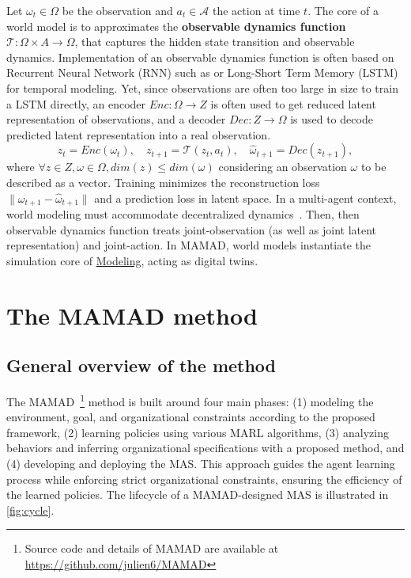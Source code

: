 \documentclass[pdflatex,sn-mathphys-num]{sn-jnl}%
\theoremstyle{thmstyleone}%
\theoremstyle{thmstyletwo}%
\theoremstyle{thmstylethree}%
\begin{document}
Let $\omega_t \in \Omega$ be the observation and $a_t \in \mathcal{A}$ the action at time $t$. The core of a world model is to approximates the \textbf{observable dynamics function} $\mathcal{T}: \Omega \times A \rightarrow \Omega$, that captures the hidden state transition and observable dynamics. Implementation of an observable dynamics function is often based on Recurrent Neural Network (RNN) such as or Long-Short Term Memory (LSTM)~\cite{hochreiter1997long} for temporal modeling. Yet, since observations are often too large in size to train a LSTM directly, an encoder $Enc: \Omega \rightarrow Z$ is often used to get reduced latent representation of observations, and a decoder $Dec: Z \rightarrow \Omega$ is used to decode predicted latent representation into a real observation.
\[
    z_t = Enc(\omega_t), \quad
    z_{t+1} = \mathcal{T}(z_t, a_t), \quad
    \hat{\omega}_{t+1} = Dec(z_{t+1}),
\]
where $\forall z \in Z, \omega \in \Omega, dim(z) \leq dim(\omega)$ considering an observation $\omega$ to be described as a vector.
Training minimizes the reconstruction loss $\|\omega_{t+1} - \hat{\omega}_{t+1}\|$ and a prediction loss in latent space.
%
In a multi-agent context, world modeling must accommodate decentralized dynamics~\cite{yang2021representation}. Then, then observable dynamics function treats joint-observation (as well as joint latent representation) and joint-action. In MAMAD, world models instantiate the simulation core of \hyperref[sec:modelling]{Modeling}, acting as digital twins.



\section{The MAMAD method}\label{sec:mamad}

\subsection{General overview of the method}

The MAMAD~\footnote{Source code and details of MAMAD are available at \url{https://github.com/julien6/MAMAD}} method is built around four main phases: (1) modeling the environment, goal, and organizational constraints according to the proposed framework, (2) learning policies using various MARL algorithms, (3) analyzing behaviors and inferring organizational specifications with a proposed method, and (4) developing and deploying the MAS. This approach guides the agent learning process while enforcing strict organizational constraints, ensuring the efficiency of the learned policies. The lifecycle of a MAMAD-designed MAS is illustrated in \autoref{fig:cycle}.
\end{document}
